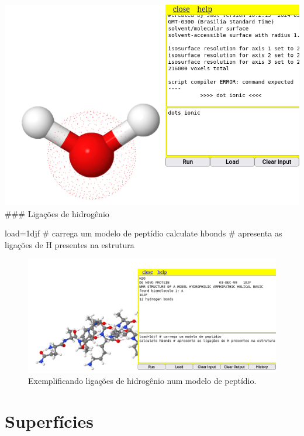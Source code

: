 \documentclass[
  letterpaper,
  DIV=11,
  numbers=noendperiod]{scrreprt}
\newenvironment{Shaded}{\begin{snugshade}}{\end{snugshade}}
\newcommand{\CommentTok}[1]{\textcolor[rgb]{0.37,0.37,0.37}{#1}}
\newcommand{\DecValTok}[1]{\textcolor[rgb]{0.68,0.00,0.00}{#1}}
\newcommand{\NormalTok}[1]{\textcolor[rgb]{0.00,0.23,0.31}{#1}}
\newcommand{\OtherTok}[1]{\textcolor[rgb]{0.00,0.23,0.31}{#1}}
\begin{document}
\includegraphics{ionic.png} \#\#\# Ligações de hidrogênio

\begin{Shaded}
\begin{Highlighting}[]
\NormalTok{load}\OtherTok{=}\DecValTok{1}\NormalTok{djf }\CommentTok{\# carrega um modelo de peptídio}
\NormalTok{calculate hbonds }\CommentTok{\# apresenta as ligações de H presentes na estrutura}
\end{Highlighting}
\end{Shaded}

\begin{figure}[H]

{\centering \includegraphics{ligacoesH.png}

}

\caption{Exemplificando ligações de hidrogênio num modelo de peptídio.}

\end{figure}%

\section{Superfícies}\label{superfuxedcies}
\end{document}
